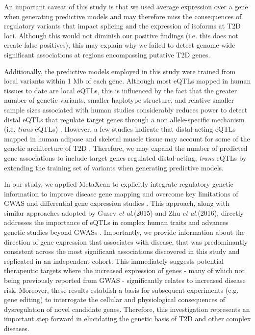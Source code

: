 \documentclass[10pt]{article}
\begin{document}
An important caveat of this study is that we used average expression over a gene when generating predictive models and may therefore miss the consequences of regulatory variants that impact splicing and the expression of isoforms at T2D loci. Although this would not diminish our positive findings (i.e. this does not create false positives), this may explain why we failed to detect genome-wide significant associations at regions encompassing putative T2D genes. 

Additionally, the predictive models employed in this study were trained from local variants within 1 Mb of each gene. Although most eQTLs mapped in human tissues to date are local eQTLs, this is influenced by the fact that the greater number of genetic variants, smaller haplotype structure, and relative smaller sample sizes associated with human studies considerably reduces power to detect distal eQTLs that regulate target genes through a non allele-specific mechanism (i.e. \textit{trans} eQTLs) \cite{Albert2015}. However, a few studies indicate that distal-acting eQTLs mapped in human adipose and skeletal muscle tissue may account for some of the genetic architecture of T2D \cite{Elbein2012, Torres2014}. Therefore, we may expand the number of predicted gene associations to include target genes regulated distal-acting, \textit{trans} eQTLs by extending the training set of variants when generating predictive models. 

In our study, we applied MetaXcan to explicitly integrate regulatory genetic information to improve disease gene mapping and overcome key limitations of GWAS and differential gene expression studies \cite{Gamazon2015}. This approach, along with similar approaches adopted by Gusev \textit{et al.}(2015) and Zhu \textit{et al.}(2016), directly addresses the importance of eQTLs in complex human traits and advances genetic studies beyond GWASs \cite{Gusev2015, Zhu2016}. Importantly, we provide information about the direction of gene expression that associates with disease, that was predominantly consistent across the most significant associations discovered in this study and replicated in an independent cohort. This immediately suggests potential therapeutic targets where the increased expression of genes - many of which not being previously reported from GWAS - significantly relates to increased disease risk. Moreover, these results establish a basis for subsequent experiments (e.g. gene editing) to interrogate the cellular and physiological consequences of dysregulation of novel candidate genes. Therefore, this investigation represents an important step forward in elucidating the genetic basis of T2D and other complex diseases. 
\end{document}
